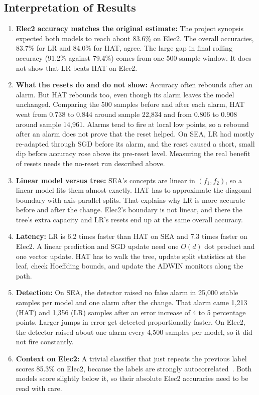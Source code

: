 \documentclass[conference]{IEEEtran}
\begin{document}
\subsection{Interpretation of Results}
\begin{enumerate}
    \item \textbf{Elec2 accuracy matches the original estimate:} The project synopsis expected both models to reach about 83.6\% on Elec2. The overall accuracies, 83.7\% for LR and 84.0\% for HAT, agree. The large gap in final rolling accuracy (91.2\% against 79.4\%) comes from one 500-sample window. It does not show that LR beats HAT on Elec2.
    \item \textbf{What the resets do and do not show:} Accuracy often rebounds after an alarm. But HAT rebounds too, even though its alarm leaves the model unchanged. Comparing the 500 samples before and after each alarm, HAT went from 0.738 to 0.844 around sample 22{,}834 and from 0.806 to 0.908 around sample 14{,}961. Alarms tend to fire at local low points, so a rebound after an alarm does not prove that the reset helped. On SEA, LR had mostly re-adapted through SGD before its alarm, and the reset caused a short, small dip before accuracy rose above its pre-reset level. Measuring the real benefit of resets needs the no-reset run described above.
    \item \textbf{Linear model versus tree:} SEA's concepts are linear in $(f_1, f_2)$, so a linear model fits them almost exactly. HAT has to approximate the diagonal boundary with axis-parallel splits. That explains why LR is more accurate before and after the change. Elec2's boundary is not linear, and there the tree's extra capacity and LR's resets end up at the same overall accuracy.
    \item \textbf{Latency:} LR is 6.2 times faster than HAT on SEA and 7.3 times faster on Elec2. A linear prediction and SGD update need one $O(d)$ dot product and one vector update. HAT has to walk the tree, update split statistics at the leaf, check Hoeffding bounds, and update the ADWIN monitors along the path.
    \item \textbf{Detection:} On SEA, the detector raised no false alarm in 25{,}000 stable samples per model and one alarm after the change. That alarm came 1{,}213 (HAT) and 1{,}356 (LR) samples after an error increase of 4 to 5 percentage points. Larger jumps in error get detected proportionally faster. On Elec2, the detector raised about one alarm every 4{,}500 samples per model, so it did not fire constantly.
    \item \textbf{Context on Elec2:} A trivial classifier that just repeats the previous label scores 85.3\% on Elec2, because the labels are strongly autocorrelated~\cite{zliobaite2013}. Both models score slightly below it, so their absolute Elec2 accuracies need to be read with care.
\end{enumerate}
\end{document}
